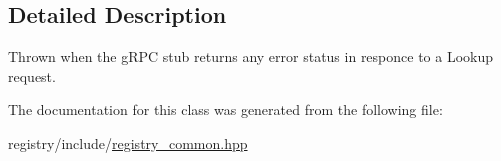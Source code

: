 \subsection{Detailed Description}
Thrown when the g\+R\+PC stub returns any error status in responce to a Lookup request. 

The documentation for this class was generated from the following file\+:\begin{DoxyCompactItemize}
\item 
registry/include/\hyperlink{registry__common_8hpp}{registry\+\_\+common.\+hpp}\end{DoxyCompactItemize}
